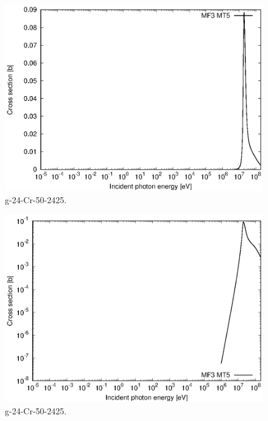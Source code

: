 \begin{figure}
 \includegraphics[width=\linewidth]{eps/g_24-Cr-50_2425.eps}
  \caption{g-24-Cr-50-2425.}
\end{figure}
\begin{figure}
 \includegraphics[width=\linewidth]{eps-log/g_24-Cr-50_2425.eps}
 \caption{g-24-Cr-50-2425.}
\end{figure}
\newpage \clearpage

